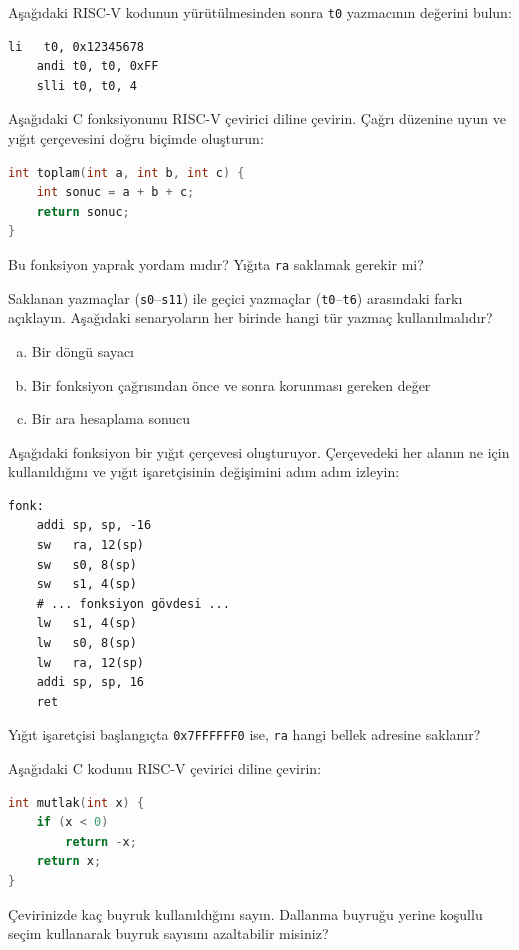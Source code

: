 \begin{alistirma}[\kolay]
Aşağıdaki RISC-V kodunun yürütülmesinden sonra \texttt{t0} yazmacının değerini bulun:
\begin{lstlisting}[style=riscv]
    li   t0, 0x12345678
    andi t0, t0, 0xFF
    slli t0, t0, 4
\end{lstlisting}
\end{alistirma}

\begin{alistirma}[\orta]
Aşağıdaki C fonksiyonunu RISC-V çevirici diline çevirin. Çağrı düzenine uyun ve yığıt çerçevesini doğru biçimde oluşturun:
\begin{lstlisting}[language=C, style=alistirma-kod]
int toplam(int a, int b, int c) {
    int sonuc = a + b + c;
    return sonuc;
}
\end{lstlisting}
Bu fonksiyon yaprak yordam mıdır? Yığıta \texttt{ra} saklamak gerekir mi?
\end{alistirma}

\begin{alistirma}[\orta]
Saklanan yazmaçlar (\texttt{s0}--\texttt{s11}) ile geçici yazmaçlar (\texttt{t0}--\texttt{t6}) arasındaki farkı açıklayın. Aşağıdaki senaryoların her birinde hangi tür yazmaç kullanılmalıdır?
\begin{enumerate}[(a)]
\item Bir döngü sayacı
\item Bir fonksiyon çağrısından önce ve sonra korunması gereken değer
\item Bir ara hesaplama sonucu
\end{enumerate}
\end{alistirma}

\begin{alistirma}[\orta]
Aşağıdaki fonksiyon bir yığıt çerçevesi oluşturuyor. Çerçevedeki her alanın ne için kullanıldığını ve yığıt işaretçisinin değişimini adım adım izleyin:
\begin{lstlisting}[style=riscv]
fonk:
    addi sp, sp, -16
    sw   ra, 12(sp)
    sw   s0, 8(sp)
    sw   s1, 4(sp)
    # ... fonksiyon gövdesi ...
    lw   s1, 4(sp)
    lw   s0, 8(sp)
    lw   ra, 12(sp)
    addi sp, sp, 16
    ret
\end{lstlisting}
Yığıt işaretçisi başlangıçta \texttt{0x7FFFFFF0} ise, \texttt{ra} hangi bellek adresine saklanır?
\end{alistirma}

\begin{alistirma}[\orta]
Aşağıdaki C kodunu RISC-V çevirici diline çevirin:
\begin{lstlisting}[language=C, style=alistirma-kod]
int mutlak(int x) {
    if (x < 0)
        return -x;
    return x;
}
\end{lstlisting}
Çevirinizde kaç buyruk kullanıldığını sayın. Dallanma buyruğu yerine koşullu seçim kullanarak buyruk sayısını azaltabilir misiniz?
\end{alistirma}

